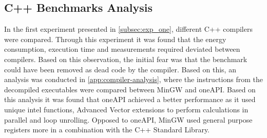 \subsection{C++ Benchmarks Analysis}

In the first experiment presented in \cref{subsec:exp_one}, different C++ compilers were compared. Through this experiment it was found that the energy consumption, execution time and measurements required deviated between compilers. Based on this observation, the initial fear was that the benchmark could have been removed as dead code by the compiler. Based on this, an analysis was conducted in \cref{app:compiler-analysis}, where the instructions from the decompiled executables were compared between MinGW and oneAPI. Based on this analysis it was found that oneAPI achieved a better performance as it used unique intel functions, Advanced Vector extensions to perform calculations in parallel and loop unrolling. Opposed to oneAPI, MinGW used general purpose registers more in a combination with the C++ Standard Library. 






